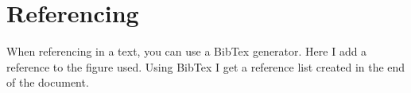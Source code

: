 \documentclass{article}
\begin{document}
\section{Referencing}
When referencing in a text, you can use a BibTex generator.\newline
Here I add a reference to the figure\cite{kim-rush-2016-sequence} used. Using BibTex I get a reference list created in the end of the document.



\end{document}
